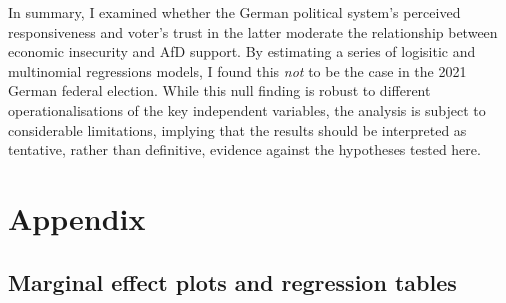 \documentclass[
]{article}
\begin{document}
In summary, I examined whether the German political system's perceived
responsiveness and voter's trust in the latter moderate the relationship
between economic insecurity and AfD support. By estimating a series of
logisitic and multinomial regressions models, I found this \emph{not} to
be the case in the 2021 German federal election. While this null finding
is robust to different operationalisations of the key independent
variables, the analysis is subject to considerable limitations, implying
that the results should be interpreted as tentative, rather than
definitive, evidence against the hypotheses tested here.

\hypertarget{appendix}{%
\section{Appendix}\label{appendix}}

\hypertarget{marginal-effect-plots-and-regression-tables}{%
\subsection{Marginal effect plots and regression
tables}\label{marginal-effect-plots-and-regression-tables}}
\end{document}
